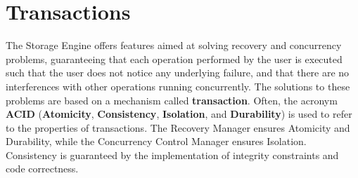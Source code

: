 \chapter{Transactions}

The Storage Engine offers features aimed at solving recovery and concurrency problems, guaranteeing that each operation performed by the user is executed such that the user does not notice any underlying failure, and that there are no interferences with other operations running concurrently. The solutions to these problems are based on a mechanism called \textbf{transaction}.
Often, the acronym \textbf{ACID} (\textbf{Atomicity}, \textbf{Consistency}, \textbf{Isolation}, and \textbf{Durability}) is used to refer to the properties of transactions. The Recovery Manager ensures Atomicity and Durability, while the Concurrency Control Manager ensures Isolation. Consistency is guaranteed by the implementation of integrity constraints and code correctness.


